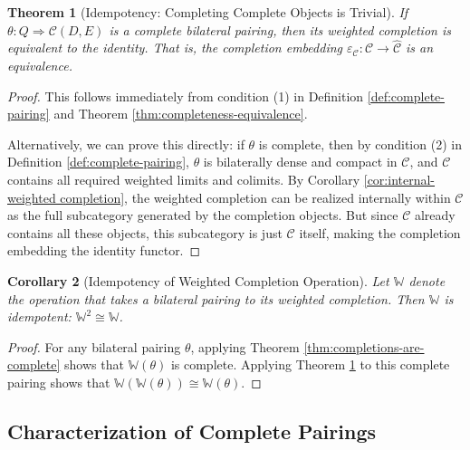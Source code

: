 \documentclass[11pt]{article}
\theoremstyle{plain}
\newtheorem{theorem}{Theorem}[section]
\newtheorem{corollary}[theorem]{Corollary}
\theoremstyle{definition}
\theoremstyle{remark}
\newcommand{\C}{\mathcal{C}}
\newcommand{\wh}[1]{\widehat{#1}}
\begin{document}
\begin{theorem}[Idempotency: Completing Complete Objects is Trivial]\label{thm:idempotency}
If $\theta : Q \Rightarrow \C(D, E)$ is a complete bilateral pairing, then its weighted completion is equivalent to the identity. That is, the completion embedding $\varepsilon_\C : \C \to \wh{\C}$ is an equivalence.
\end{theorem}

\begin{proof}
This follows immediately from condition (1) in Definition \ref{def:complete-pairing} and Theorem \ref{thm:completeness-equivalence}.

Alternatively, we can prove this directly: if $\theta$ is complete, then by condition (2) in Definition \ref{def:complete-pairing}, $\theta$ is bilaterally dense and compact in $\C$, and $\C$ contains all required weighted limits and colimits. By Corollary \ref{cor:internal-weighted completion}, the weighted completion can be realized internally within $\C$ as the full subcategory generated by the completion objects. But since $\C$ already contains all these objects, this subcategory is just $\C$ itself, making the completion embedding the identity functor.
\end{proof}

\begin{corollary}[Idempotency of Weighted Completion Operation]\label{cor:operation-idempotency}
Let $\mathbb{W}$ denote the operation that takes a bilateral pairing to its weighted completion. Then $\mathbb{W}$ is idempotent: $\mathbb{W}^2 \cong \mathbb{W}$.
\end{corollary}

\begin{proof}
For any bilateral pairing $\theta$, applying Theorem \ref{thm:completions-are-complete} shows that $\mathbb{W}(\theta)$ is complete. Applying Theorem \ref{thm:idempotency} to this complete pairing shows that $\mathbb{W}(\mathbb{W}(\theta)) \cong \mathbb{W}(\theta)$.
\end{proof}

\subsection{Characterization of Complete Pairings}
\end{document}
